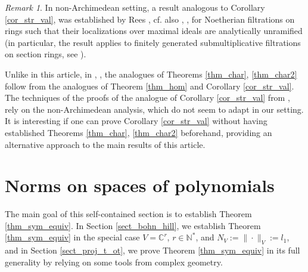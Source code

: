 \documentclass[12pt]{article}
\numberwithin{equation}{section}
\theoremstyle{theorem}
\theoremstyle{definition}
\theoremstyle{remark}
\newtheorem{rem}[thm]{Remark}
\newcommand{\comp}{\mathbb{C}}
\newcommand{\nat}{\mathbb{N}}
\begin{document}
	\begin{rem}
		In non-Archimedean setting, a result analogous to Corollary \ref{cor_str_val}, was established by Rees \cite[Theorem 3.4]{ReesValII}, cf. also \cite[\S 5.3]{ReesBook}, \cite[Theorem 2.3]{BouckJohn21}, for Noetherian filtrations on rings such that their localizations over maximal ideals are analytically unramified (in particular, the result applies to finitely generated submultiplicative filtrations on section rings, see \cite[\S 9]{SwanHuneke}).
		\par 
		Unlike in this article, in \cite{ReesValII}, \cite{BouckJohn21}, the analogues of Theorems \ref{thm_char},  \ref{thm_char2} follow from the analogues of Theorem \ref{thm_hom} and Corollary \ref{cor_str_val}.
		The techniques of the proofs of the analogue of Corollary \ref{cor_str_val} from \cite{ReesValII}, \cite{BouckJohn21} rely on the non-Archimedean analysis, which do not seem to adapt in our setting.
		It is interesting if one can prove Corollary \ref{cor_str_val} without having established Theorems \ref{thm_char}, \ref{thm_char2} beforehand, providing an alternative approach to the main results of this article.
	\end{rem}

	
	\section{Norms on spaces of polynomials}\label{sec_norm_poly_big}
	The main goal of this self-contained section is to establish Theorem \ref{thm_sym_equiv}.
	In Section \ref{sect_bohn_hill}, we establish Theorem \ref{thm_sym_equiv} in the special case  $V = \comp^r$, $r \in \nat^*$, and $N_V := \| \cdot \|_V := \textit{l}_1$, and in Section \ref{sect_proj_t_ot}, we prove Theorem \ref{thm_sym_equiv} in its full generality by relying on some tools from complex geometry.
	
\end{document}
